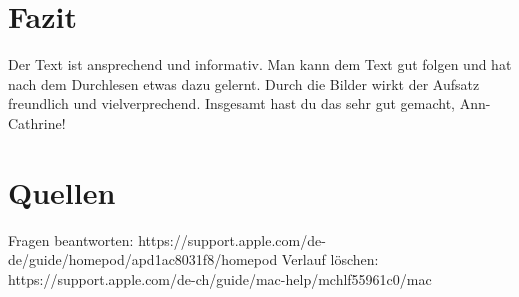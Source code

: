 \documentclass{article}
\begin{document}
\section{Fazit}
Der Text ist ansprechend und informativ. Man kann dem Text gut folgen und hat nach dem Durchlesen etwas dazu gelernt. Durch die Bilder wirkt der Aufsatz freundlich und vielverprechend. Insgesamt hast du das sehr gut gemacht, Ann-Cathrine! 

\section{Quellen}
Fragen beantworten: https://support.apple.com/de-de/guide/homepod/apd1ac8031f8/homepod \label{Apple Support}
Verlauf löschen: https://support.apple.com/de-ch/guide/mac-help/mchlf55961c0/mac \label{Verlauf löschen}
\end{document}
